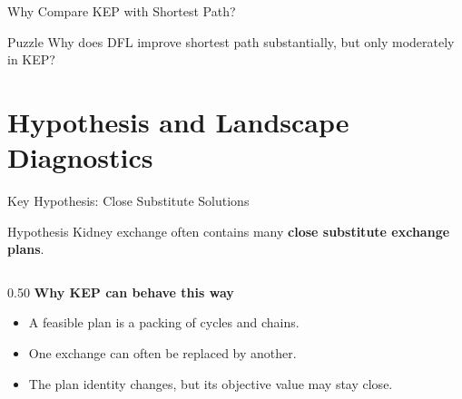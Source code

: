 \documentclass[aspectratio=169,10pt]{beamer}
\newcommand{\tightitems}{\setlength{\itemsep}{0.35em}}
\begin{document}
\begin{frame}{Why Compare KEP with Shortest Path?}
  \vspace{0.6em}
  \begin{alertblock}{Puzzle}
    \centering
    Why does DFL improve shortest path substantially, but only moderately in KEP?
  \end{alertblock}
\end{frame}

\section{Hypothesis and Landscape Diagnostics}

\begin{frame}{Key Hypothesis: Close Substitute Solutions}
  \small
  \centering
  \begin{block}{Hypothesis}
    \centering
    Kidney exchange often contains many \textbf{close substitute exchange plans}.
  \end{block}

  \vspace{0.4em}
  \begin{columns}[T,onlytextwidth]
    \begin{column}{0.50\textwidth}
      \textbf{Why KEP can behave this way}
      \begin{itemize}\tightitems
        \item A feasible plan is a packing of cycles and chains.
        \item One exchange can often be replaced by another.
        \item The plan identity changes, but its objective value may stay close.
      \end{itemize}

      \vspace{0.35em}
      \centering
    \end{column}


\end{columns}
\end{frame}
\end{document}
